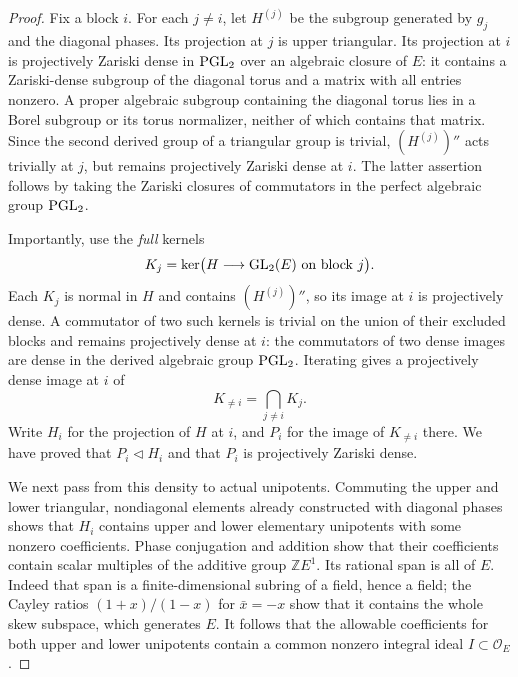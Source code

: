 \begin{proof}
Fix a block $i$. For each $j\ne i$, let $H^{(j)}$ be the subgroup
generated by $g_j$ and the diagonal phases. Its projection at $j$ is
upper triangular. Its projection at $i$ is projectively Zariski dense
in $\operatorname{PGL}_2$ over an algebraic closure of $E$: it contains a
Zariski-dense subgroup of the diagonal
torus and a matrix with all entries nonzero. A proper algebraic subgroup
containing the diagonal torus lies in a Borel subgroup or its torus
normalizer, neither of which contains that matrix. Since the second
derived group of a triangular group is trivial,
$(H^{(j)})''$ acts trivially at $j$, but remains projectively Zariski
dense at $i$. The latter assertion follows by taking the Zariski
closures of commutators in the perfect algebraic group $\operatorname{PGL}_2$.

Importantly, use the \emph{full} kernels
\[
 K_j=\ker\bigl(H\longrightarrow\operatorname{GL}_2(E)
                         \text{ on block }j\bigr).
\]
Each $K_j$ is normal in $H$ and contains $(H^{(j)})''$, so its image
at $i$ is projectively dense. A commutator of two such kernels is
trivial on the union of their excluded blocks and remains projectively
dense at $i$: the commutators of two dense images are dense in the
derived algebraic group $\operatorname{PGL}_2$. Iterating gives a projectively dense
image at $i$ of
\[
 K_{\ne i}=\bigcap_{j\ne i}K_j.
\]
Write $H_i$ for the projection of $H$ at $i$, and $P_i$ for the image
of $K_{\ne i}$ there. We have proved that $P_i\triangleleft H_i$ and
that $P_i$ is projectively Zariski dense.

We next pass from this density to actual unipotents. Commuting the
upper and lower triangular, nondiagonal elements already constructed
with diagonal phases shows that $H_i$ contains upper and lower
elementary unipotents with some nonzero coefficients. Phase conjugation
and addition show that their coefficients contain scalar multiples of
the additive group $\mathbb Z E^1$. Its rational span is all of $E$.
Indeed that span is a finite-dimensional subring of a field, hence a
field; the Cayley ratios $(1+x)/(1-x)$ for $\bar x=-x$ show that it
contains the whole skew subspace, which generates $E$. It follows that
the allowable coefficients for both upper and lower unipotents contain
a common nonzero integral ideal $I\subset\mathcal O_E$.


\end{proof}
